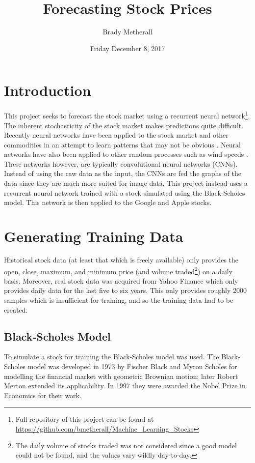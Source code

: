 \documentclass[12pt]{article}
\title{Forecasting Stock Prices}
\author{Brady Metherall}
\date{Friday December 8, 2017}
\begin{document}
\maketitle

\section{Introduction}

This project seeks to forecast the stock market using a recurrent neural network\footnote{Full repository of this project can be found at \url{https://github.com/bmetherall/Machine_Learning_Stocks}}. The inherent stochasticity of the stock market makes predictions quite difficult. Recently neural networks have been applied to the stock market and other commodities in an attempt to learn patterns that may not be obvious \cite{bao, rainer1, rainer2, ashwin}. Neural networks have also been applied to other random processes such as wind speeds \cite{rainer2}. These networks however, are typically convolutional neural networks (CNNs). Instead of using the raw data as the input, the CNNs are fed the graphs of the data since they are much more suited for image data. This project instead uses a recurrent neural network trained with a stock simulated using the Black-Scholes model. This network is then applied to the Google and Apple stocks.

\section{Generating Training Data}

Historical stock data (at least that which is freely available) only provides the open, close, maximum, and minimum price (and volume traded\footnote{The daily volume of stocks traded was not considered since a good model could not be found, and the values vary wildly day-to-day.}) on a daily basis. Moreover, real stock data was acquired from Yahoo Finance which only provides daily data for the last five to six years. This only provides roughly 2000 samples which is insufficient for training, and so the training data had to be created.

\subsection{Black-Scholes Model}

To simulate a stock for training the Black-Scholes model was used. The Black-Scholes model was developed in 1973 by Fischer Black and Myron Scholes for modelling the financial market with geometric Brownian motion; later Robert Merton extended its applicability. In 1997 they were awarded the Nobel Prize in Economics for their work. \\
\end{document}
